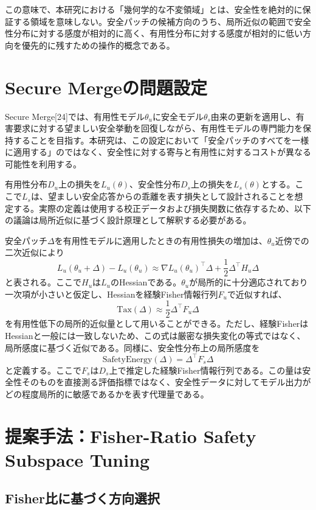 この意味で、本研究における「幾何学的な不変領域」とは、安全性を絶対的に保証する領域を意味しない。安全パッチの候補方向のうち、局所近似の範囲で安全性分布に対する感度が相対的に高く、有用性分布に対する感度が相対的に低い方向を優先的に残すための操作的概念である。


\section{Secure Mergeの問題設定}
\label{app:secure-merge-formulation}

Secure Merge[24]では、有用性モデル\(\theta_u\)に安全モデル\(\theta_s\)由来の更新を適用し、有害要求に対する望ましい安全挙動を回復しながら、有用性モデルの専門能力を保持することを目指す。本研究は、この設定において「安全パッチのすべてを一様に適用する」のではなく、安全性に対する寄与と有用性に対するコストが異なる可能性を利用する。

有用性分布\(D_u\)上の損失を\(L_u(\theta)\)、安全性分布\(D_s\)上の損失を\(L_s(\theta)\)とする。ここで\(L_s\)は、望ましい安全応答からの乖離を表す損失として設計されることを想定する。実際の定義は使用する校正データおよび損失関数に依存するため、以下の議論は局所近似に基づく設計原理として解釈する必要がある。

安全パッチ\(\Delta\)を有用性モデルに適用したときの有用性損失の増加は、\(\theta_u\)近傍での二次近似により
\[
L_u(\theta_u+\Delta)-L_u(\theta_u)
\approx
\nabla L_u(\theta_u)^\top \Delta
+
\frac{1}{2}\Delta^\top H_u\Delta
\]
と表される。ここで\(H_u\)は\(L_u\)のHessianである。\(\theta_u\)が局所的に十分適応されており一次項が小さいと仮定し、Hessianを経験Fisher情報行列\(F_u\)で近似すれば、
\[
\mathrm{Tax}(\Delta)
\approx
\frac{1}{2}\Delta^\top F_u\Delta
\]
を有用性低下の局所的近似量として用いることができる。ただし、経験FisherはHessianと一般には一致しないため、この式は厳密な損失変化の等式ではなく、局所感度に基づく近似である。同様に、安全性分布上の局所感度を
\[
\mathrm{SafetyEnergy}(\Delta)
=
\Delta^\top F_s\Delta
\]
と定義する。ここで\(F_s\)は\(D_s\)上で推定した経験Fisher情報行列である。この量は安全性そのものを直接測る評価指標ではなく、安全性データに対してモデル出力がどの程度局所的に敏感であるかを表す代理量である。


\section{提案手法：Fisher-Ratio Safety Subspace Tuning}
\label{app:sst}

\subsection{Fisher比に基づく方向選択}

